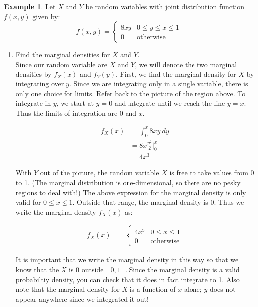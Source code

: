\documentclass[12pt]{article}
\theoremstyle{definition}
\newtheorem*{example}{Example}
\theoremstyle{remark}
\begin{document}
\begin{example}
Let $X$ and $Y$ be random variables with joint distribution function $f(x, y)$ given by:
\[
f(x, y) = \begin{cases} 
      8 x y  & 0 \leq y \leq x \leq 1 \\
      0 & \textrm{otherwise}
   \end{cases}
\]
\begin{enumerate}
\item Find the marginal densities for $X$ and $Y$.\\

Since our random variable are $X$ and $Y$, we will denote the two marginal densities by $f_X(x)$ and $f_Y(y)$. First, we find the marginal density for $X$ by integrating over $y$. Since we are integrating only in a single variable, there is only one choice for limits. Refer back to the picture of the region above. To integrate in $y$, we start at $y = 0$ and integrate until we reach the line $y = x$. Thus the limits of integration are 0 and $x$.

\begin{align*}
f_X(x) &= \int_0^x 8 x y \: dy \\
&= 8x \frac{y^2}{2} \Bigr|_0^x \\
&= 4 x^3
\end{align*}

With $Y$ out of the picture, the random variable $X$ is free to take values from 0 to 1. (The marginal distribution is one-dimensional, so there are no pesky regions to deal with!) The above expression for the marginal density is only valid for $0 \leq x \leq 1$. Outside that range, the marginal density is 0. Thus we write the marginal density $f_X(x)$ as:

\begin{align*}
f_X(x) &= \begin{cases}
  4 x^3 & 0 \leq x \leq 1 \\
  0 & \textrm{otherwise}
   \end{cases}
\end{align*}

It is important that we write the marginal density in this way so that we know that the $X$ is 0 outside $[0, 1]$. Since the marginal density is a valid probabiltiy density, you can check that it does in fact integrate to 1. Also note that the marginal density for $X$ is a function of $x$ alone; $y$ does not appear anywhere since we integrated it out!\\


\end{enumerate}
\end{example}
\end{document}
